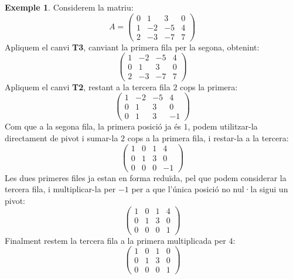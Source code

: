 \documentclass[a4paper,12pt,twoside]{article}
\newcommand{\1}{\mathbf{1}}
\newcommand{\0}{\mathbf{0}}
\theoremstyle{definition}
\newtheorem{exemple}[teorema]{Exemple}
\theoremstyle{remark}
\begin{document}
\begin{exemple}
Considerem la matriu:
$$
A=\begin{pmatrix}
0 & 1 & 3 & 0 \\  1 & -2 & -5 & 4\\ 2 & -3 & -7 & 7
\end{pmatrix}
$$
Apliquem el canvi \textbf{T3}, canviant la primera fila per la segona, obtenint:
$$
\begin{pmatrix}
1 & -2 & -5 & 4\\0 & 1 & 3 & 0 \\   2 & -3 & -7 & 7
\end{pmatrix}
$$
Apliquem el canvi \textbf{T2}, restant a la tercera fila $2$ cops la primera:
$$
\begin{pmatrix}
1 & -2 & -5 & 4\\0 & 1 & 3 & 0 \\   0 & 1 & 3 & -1
\end{pmatrix}
$$
Com que a la segona fila, la primera posició ja és $1$, podem utilitzar-la directament de pivot i sumar-la $2$ cops a la primera fila, i restar-la a la tercera:
$$
\begin{pmatrix}
1 & 0 & 1 & 4\\0 & 1 & 3 & 0 \\   0 & 0 & 0 & -1
\end{pmatrix}
$$
Les dues primeres files ja estan en forma reduïda, pel que podem considerar la tercera fila, i multiplicar-la per $-1$ per a que l'única posició no nul·la sigui un pivot:
$$
\begin{pmatrix}
1 & 0 & 1 & 4\\0 & 1 & 3 & 0 \\   0 & 0 & 0 & 1
\end{pmatrix}
$$
Finalment restem la tercera fila a la primera multiplicada per $4$:
$$
\begin{pmatrix}
1 & 0 & 1 & 0\\0 & 1 & 3 & 0 \\   0 & 0 & 0 & 1
\end{pmatrix}
$$
\end{exemple}
\end{document}
